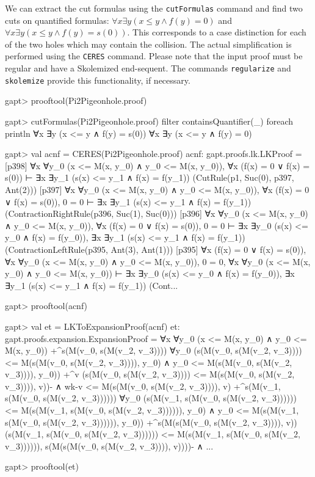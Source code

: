 \documentclass[a4paper,11pt]{book}
\renewcommand{\land}{\wedge}
\begin{document}
We can extract the cut formulas using the \texttt{cutFormulas} command and find two
cuts on quantified formulas: $\forall x \exists y (x \leq y \land f(y) = 0)$
and $\forall x \exists y (x \leq y \land f(y) = s(0))$.
This corresponds to a case distinction for each of the two holes which may contain the collision.
The actual simplification is performed using the \texttt{CERES} command. Please note
that the input proof must be regular and have a Skolemized end-sequent.
The commands \texttt{regularize} and \texttt{skolemize} provide this functionality,
if necessary.

\begin{clilisting}
gapt> prooftool(Pi2Pigeonhole.proof)

gapt> cutFormulas(Pi2Pigeonhole.proof) filter {containsQuantifier(_)} foreach println
∀x ∃y (x <= y ∧ f(y) = s(0))
∀x ∃y (x <= y ∧ f(y) = 0)

gapt> val acnf = CERES(Pi2Pigeonhole.proof)
acnf: gapt.proofs.lk.LKProof =
[p398] ∀x ∀y_0 (x <= M(x, y_0) ∧ y_0 <= M(x, y_0)),
∀x (f(x) = 0 ∨ f(x) = s(0))
⊢
∃x ∃y_1 (s(x) <= y_1 ∧ f(x) = f(y_1))    (CutRule(p1, Suc(0), p397, Ant(2)))
[p397] ∀x ∀y_0 (x <= M(x, y_0) ∧ y_0 <= M(x, y_0)),
∀x (f(x) = 0 ∨ f(x) = s(0)),
0 = 0
⊢
∃x ∃y_1 (s(x) <= y_1 ∧ f(x) = f(y_1))    (ContractionRightRule(p396, Suc(1), Suc(0)))
[p396] ∀x ∀y_0 (x <= M(x, y_0) ∧ y_0 <= M(x, y_0)),
∀x (f(x) = 0 ∨ f(x) = s(0)),
0 = 0
⊢
∃x ∃y_0 (s(x) <= y_0 ∧ f(x) = f(y_0)),
∃x ∃y_1 (s(x) <= y_1 ∧ f(x) = f(y_1))    (ContractionLeftRule(p395, Ant(3), Ant(1)))
[p395] ∀x (f(x) = 0 ∨ f(x) = s(0)),
∀x ∀y_0 (x <= M(x, y_0) ∧ y_0 <= M(x, y_0)),
0 = 0,
∀x ∀y_0 (x <= M(x, y_0) ∧ y_0 <= M(x, y_0))
⊢
∃x ∃y_0 (s(x) <= y_0 ∧ f(x) = f(y_0)),
∃x ∃y_1 (s(x) <= y_1 ∧ f(x) = f(y_1))    (Cont...

gapt> prooftool(acnf)

gapt> val et = LKToExpansionProof(acnf)
et: gapt.proofs.expansion.ExpansionProof =
∀x ∀y_0 (x <= M(x, y_0) ∧ y_0 <= M(x, y_0))
  +^{s(M(v_0, s(M(v_2, v_3))))}
    ∀y_0
      (s(M(v_0, s(M(v_2, v_3)))) <= M(s(M(v_0, s(M(v_2, v_3)))), y_0) ∧
        y_0 <= M(s(M(v_0, s(M(v_2, v_3)))), y_0))
    +^{v}
      (s(M(v_0, s(M(v_2, v_3)))) <= M(s(M(v_0, s(M(v_2, v_3)))), v))- ∧
      wk-{v <= M(s(M(v_0, s(M(v_2, v_3)))), v)}
  +^{s(M(v_1, s(M(v_0, s(M(v_2, v_3))))))}
    ∀y_0
      (s(M(v_1, s(M(v_0, s(M(v_2, v_3)))))) <=
          M(s(M(v_1, s(M(v_0, s(M(v_2, v_3)))))), y_0) ∧
        y_0 <= M(s(M(v_1, s(M(v_0, s(M(v_2, v_3)))))), y_0))
    +^{s(M(s(M(v_0, s(M(v_2, v_3)))), v))}
      (s(M(v_1, s(M(v_0, s(M(v_2, v_3)))))) <=
          M(s(M(v_1, s(M(v_0, s(M(v_2, v_3)))))),
              s(M(s(M(v_0, s(M(v_2, v_3)))), v))))- ∧
      ...

gapt> prooftool(et)

\end{clilisting}
\end{document}
